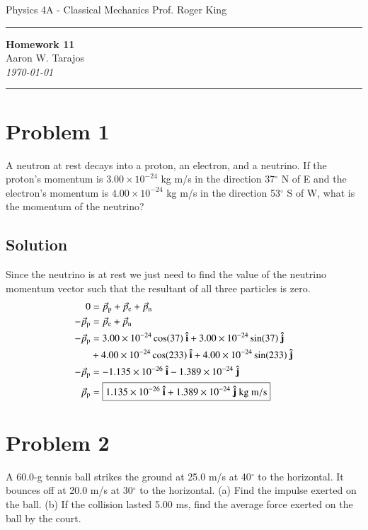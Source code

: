 \documentclass{article}
\begin{document}
\noindent
Physics 4A - Classical Mechanics \hfill Prof. Roger King

\noindent\rule{\textwidth}{0.4pt}

\begin{center}
    \textbf{\LARGE Homework 11} \\
    \vspace{12pt}
    \large Aaron W. Tarajos \\
    \textit{\today}
\end{center}

\noindent\rule{\textwidth}{0.4pt}

\section*{Problem 1}
A neutron at rest decays into a proton, an electron, and a neutrino. If the proton's momentum
is $3.00 \times 10^{-24}$ kg m/s in the direction 37$^\circ$ N of E and the electron's momentum is $4.00 \times 10^{-24}$ kg
m/s in the direction 53$^\circ$ S of W, what is the momentum of the neutrino?

\subsection*{Solution}
Since the neutrino is at rest we just need to find the value of the neutrino momentum vector such that the resultant of all three particles is zero.
\begin{align*}
	0 &= \vec{p}_\text{p} + \vec{p}_\text{e} + \vec{p}_\text{n} \\
	- \vec{p}_\text{p} &= \vec{p}_\text{e} + \vec{p}_\text{n} \\
	- \vec{p}_\text{p} &= 3.00 \times 10^{-24}\cos(37)\ \vu{i} + 3.00 \times 10^{-24}\sin(37)\ \vu{j} \\
							   &+ 4.00 \times 10^{-24}\cos(233)\ \vu{i} + 4.00 \times 10^{-24}\sin(233) \ \vu{j} \\
	- \vec{p}_\text{p} &= -1.135\times10^{-26}\ \vu{i} -1.389\times10^{-24}\ \vu{j} \\
	\vec{p}_\text{p}   &= \boxed{1.135\times10^{-26}\ \vu{i} + 1.389\times10^{-24}\ \vu{j} \ \text{kg}\ \text{m}/\text{s}}
\end{align*}


\section*{Problem 2}
A 60.0-g tennis ball strikes the ground at 25.0 m/s at 40$^\circ$ to the horizontal. It bounces off at
20.0 m/s at 30$^\circ$ to the horizontal. (a) Find the impulse exerted on the ball. (b) If the collision
lasted 5.00 ms, find the average force exerted on the ball by the court.
\end{document}
